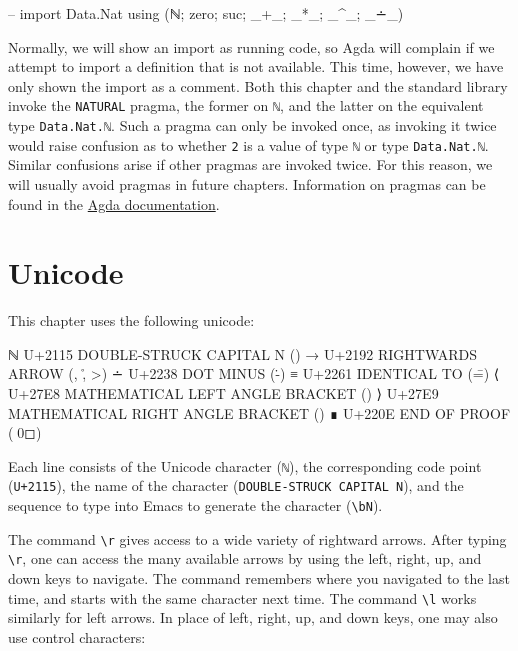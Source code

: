 \begin{fence}
\begin{code}
-- import Data.Nat using (ℕ; zero; suc; _+_; _*_; _^_; _∸_)
\end{code}
\end{fence}

Normally, we will show an import as running code, so Agda will complain
if we attempt to import a definition that is not available. This time,
however, we have only shown the import as a comment. Both this chapter
and the standard library invoke the \texttt{NATURAL} pragma, the former
on \texttt{ℕ}, and the latter on the equivalent type
\texttt{Data.Nat.ℕ}. Such a pragma can only be invoked once, as invoking
it twice would raise confusion as to whether \texttt{2} is a value of
type \texttt{ℕ} or type \texttt{Data.Nat.ℕ}. Similar confusions arise if
other pragmas are invoked twice. For this reason, we will usually avoid
pragmas in future chapters. Information on pragmas can be found in the
\href{https://agda.readthedocs.io/en/v2.6.1/language/pragmas.html}{Agda
documentation}.

\hypertarget{unicode}{%
\section{Unicode}\label{unicode}}

This chapter uses the following unicode:

\begin{myDisplay}
ℕ  U+2115  DOUBLE-STRUCK CAPITAL N (\bN)
→  U+2192  RIGHTWARDS ARROW (\to, \r, \->)
∸  U+2238  DOT MINUS (\.-)
≡  U+2261  IDENTICAL TO (\==)
⟨  U+27E8  MATHEMATICAL LEFT ANGLE BRACKET (\<)
⟩  U+27E9  MATHEMATICAL RIGHT ANGLE BRACKET (\>)
∎  U+220E  END OF PROOF (\qed)
\end{myDisplay}

Each line consists of the Unicode character (\texttt{ℕ}), the
corresponding code point (\texttt{U+2115}), the name of the character
(\texttt{DOUBLE-STRUCK\ CAPITAL\ N}), and the sequence to type into
Emacs to generate the character (\texttt{\textbackslash{}bN}).

The command \texttt{\textbackslash{}r} gives access to a wide variety of
rightward arrows. After typing \texttt{\textbackslash{}r}, one can
access the many available arrows by using the left, right, up, and down
keys to navigate. The command remembers where you navigated to the last
time, and starts with the same character next time. The command
\texttt{\textbackslash{}l} works similarly for left arrows. In place of
left, right, up, and down keys, one may also use control characters:

